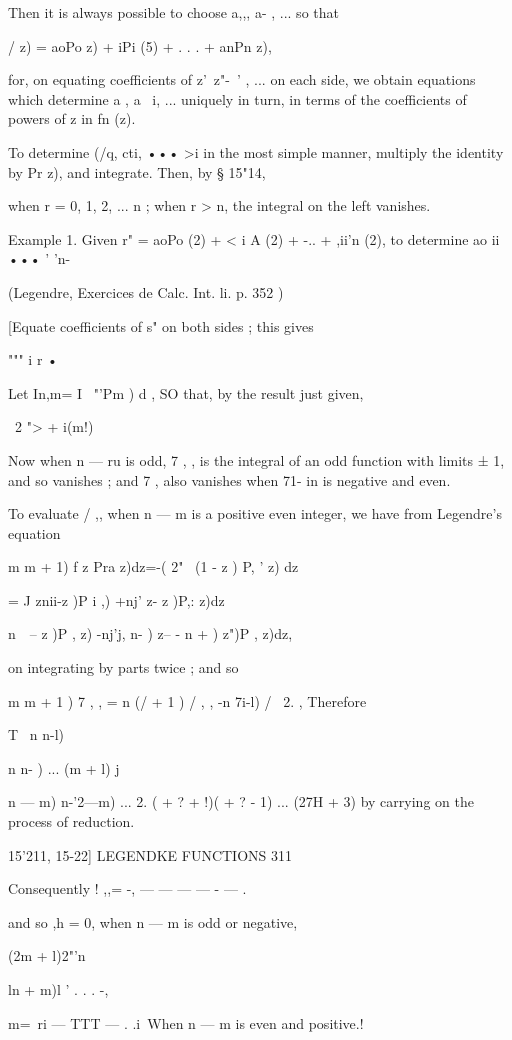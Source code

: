 {Then it is always possible to choose a,,, a- , ... so that

/ z) = aoPo z) + iPi (5) + . . . + anPn z),

for, on equating coefficients of z'\ z"-~' , ... on each side, we
obtain equations which determine a , a \ i, ... uniquely in turn, in
terms of the coefficients of powers of z in fn (z).

To determine (/q, cti, ••• >i in the most simple manner, multiply the
identity by Pr z), and integrate. Then, by § 15"14,

when r = 0, 1, 2, ... n ; when r > n, the integral on the left
vanishes.

Example 1. Given r" = aoPo (2) + < i A (2) + -.. + ,ii'n (2), to
determine ao ii ••• ' 'n-

(Legendre, Exercices de Calc. Int. li. p. 352 )

[Equate coefficients of s" on both sides ; this gives

""" i r •

Let In,m= I ~"'Pm ) d , SO that, by the result just given,

\ 2 "> + i(m!)

Now when n — ru is odd, 7 , , is the integral of an odd function with
limits ± 1, and so vanishes ; and 7 , also vanishes when 71- in is
negative and even.

To evaluate / ,, when n — m is a positive even integer, we have from
Legendre's equation

m m + 1) f z Pra z)dz=-( 2" \ (1 - z ) P, ' z) dz

= J znii-z )P i ,) +nj' z- z )P,: z)dz

  n\ \ -- z )P , z) -nj'j, n- ) z-- - n + ) z")P , z)dz,

on integrating by parts twice ; and so

m m + 1 ) 7 , , = n (/ + 1 ) / , , -n 7i-l) / \ 2. , Therefore

T \ n n-l)

n n- ) ... (m + l) j

 n — m) n-'2—m) ... 2. ( + ? + !)( + ? - 1) ... (27H + 3) by carrying
on the process of reduction.

15'211, 15-22] LEGENDKE FUNCTIONS 311

Consequently ! ,,= -, — — — — - — .

and so ,h = 0, when n — m is odd or negative,

(2m + l)2"'n\ \ {ln + m)l ' . . . -,

 m=~ri — TTT — . .i\, When n — m is even and positive.!

}}
